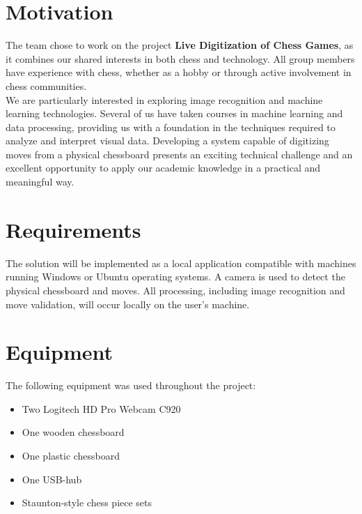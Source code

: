 \vspace{2em}

\section{Motivation}

The team chose to work on the project \textbf{Live Digitization of Chess Games}, as it combines our shared interests in both chess and technology. All group members have experience with chess, whether as a hobby or through active involvement in chess communities. \\

We are particularly interested in exploring image recognition and machine learning technologies. Several of us have taken courses in machine learning and data processing, providing us with a foundation in the techniques required to analyze and interpret visual data. Developing a system capable of digitizing moves from a physical chessboard presents an exciting technical challenge and an excellent opportunity to apply our academic knowledge in a practical and meaningful way.

\newpage

\section{Requirements}

The solution will be implemented as a local application compatible with machines running Windows or Ubuntu operating systems. A camera is used to detect the physical chessboard and moves. All processing, including image recognition and move validation, will occur locally on the user's machine.

\vspace{2em}

\section{Equipment}
The following equipment was used throughout the project:

\begin{itemize}
    \item Two Logitech HD Pro Webcam C920
    \item One wooden chessboard
    \item One plastic chessboard
    \item One USB-hub
    \item Staunton-style chess piece sets
\end{itemize}

